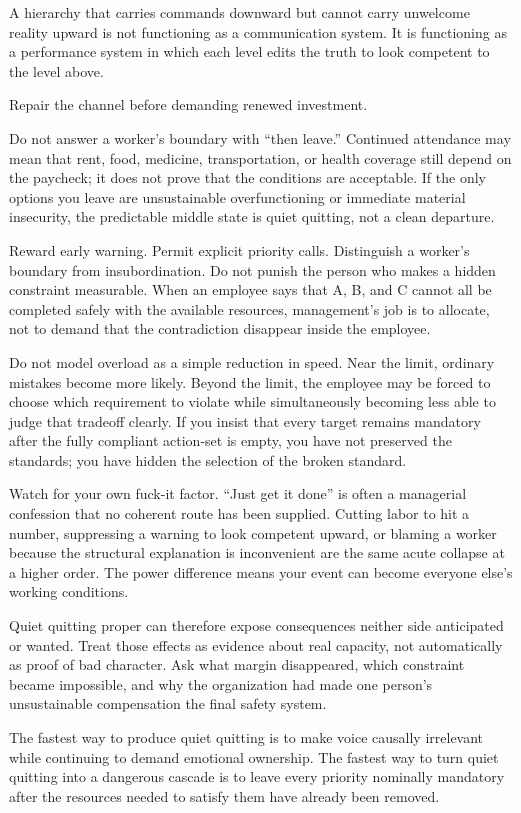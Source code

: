 \documentclass[11pt,oneside]{article}
\begin{document}
A hierarchy that carries commands downward but cannot carry unwelcome
reality upward is not functioning as a communication system. It is
functioning as a performance system in which each level edits the truth
to look competent to the level above.

Repair the channel before demanding renewed investment.

Do not answer a worker's boundary with ``then leave.'' Continued
attendance may mean that rent, food, medicine, transportation, or health
coverage still depend on the paycheck; it does not prove that the
conditions are acceptable. If the only options you leave are
unsustainable overfunctioning or immediate material insecurity, the
predictable middle state is quiet quitting, not a clean departure.

Reward early warning. Permit explicit priority calls. Distinguish a
worker's boundary from insubordination. Do not punish the person who
makes a hidden constraint measurable. When an employee says that A, B,
and C cannot all be completed safely with the available resources,
management's job is to allocate, not to demand that the contradiction
disappear inside the employee.

Do not model overload as a simple reduction in speed. Near the limit,
ordinary mistakes become more likely. Beyond the limit, the employee may
be forced to choose which requirement to violate while simultaneously
becoming less able to judge that tradeoff clearly. If you insist that
every target remains mandatory after the fully compliant action-set is
empty, you have not preserved the standards; you have hidden the
selection of the broken standard.

Watch for your own fuck-it factor. ``Just get it done'' is often a
managerial confession that no coherent route has been supplied. Cutting
labor to hit a number, suppressing a warning to look competent upward,
or blaming a worker because the structural explanation is inconvenient
are the same acute collapse at a higher order. The power difference
means your event can become everyone else's working conditions.

Quiet quitting proper can therefore expose consequences neither side
anticipated or wanted. Treat those effects as evidence about real
capacity, not automatically as proof of bad character. Ask what margin
disappeared, which constraint became impossible, and why the
organization had made one person's unsustainable compensation the final
safety system.

The fastest way to produce quiet quitting is to make voice causally
irrelevant while continuing to demand emotional ownership. The fastest
way to turn quiet quitting into a dangerous cascade is to leave every
priority nominally mandatory after the resources needed to satisfy them
have already been removed.
\end{document}
